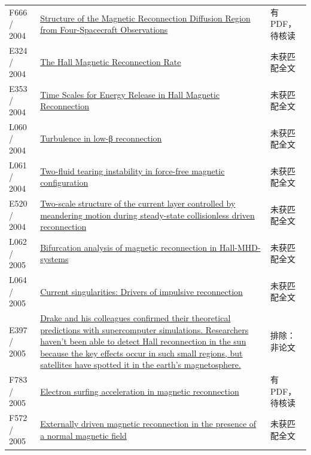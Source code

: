 \begin{longtable}{P{24mm}P{97mm}P{27mm}}
F666 / 2004 & \href{https://doi.org/10.1103/physrevlett.93.105001}{Structure of the Magnetic Reconnection Diffusion Region from Four-Spacecraft Observations} & 有PDF，待核读\\

E324 / 2004 & \href{http://ui.adsabs.harvard.edu/abs/2004APS..DPPBP1080H/abstract}{The Hall Magnetic Reconnection Rate} & 未获匹配全文\\

E353 / 2004 & \href{https://ui.adsabs.harvard.edu/abs/2004AGUSMSM43A..04H/abstract}{Time Scales for Energy Release in Hall Magnetic Reconnection} & 未获匹配全文\\

L060 / 2004 & \href{https://doi.org/10.1063/1.1776565}{Turbulence in low-β reconnection} & 未获匹配全文\\

L061 / 2004 & \href{https://doi.org/10.1063/1.1773778}{Two-fluid tearing instability in force-free magnetic configuration} & 未获匹配全文\\

E520 / 2004 & \href{https://doi.org/10.1063/1.1758718}{Two-scale structure of the current layer controlled by meandering motion during steady-state collisionless driven reconnection} & 未获匹配全文\\

L062 / 2005 & \href{https://doi.org/10.1016/j.physd.2005.06.003}{Bifurcation analysis of magnetic reconnection in Hall-MHD-systems} & 未获匹配全文\\

L064 / 2005 & \href{https://doi.org/10.1063/1.1872893}{Current singularities: Drivers of impulsive reconnection} & 未获匹配全文\\

E397 / 2005 & \href{https://terpconnect.umd.edu/~drake/news/TriggeringSolarMayhem.pdf}{Drake and his colleagues confirmed their theoretical predictions with supercomputer simulations. Researchers haven't been able to detect Hall reconnection in the sun because the key effects occur in such small regions,  but satellites have spotted it in the earth's magnetosphere.} & 排除：非论文\\

F783 / 2005 & \href{https://doi.org/10.1029/2005ja011229}{Electron surfing acceleration in magnetic reconnection} & 有PDF，待核读\\

F572 / 2005 & \href{https://doi.org/10.1029/2004ja010948}{Externally driven magnetic reconnection in the presence of a normal magnetic field} & 未获匹配全文\\


\end{longtable}
